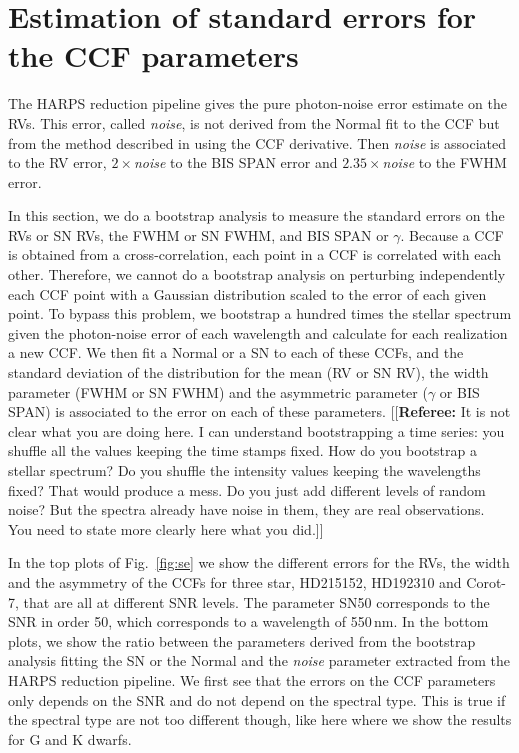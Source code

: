 \documentclass[11pt, oneside]{article}
\newcommand{\comment}[1]{{\color{red}[[\textbf{Referee: }#1]]}}
\begin{document}
\section{Estimation of standard errors for the CCF parameters} \label{sec:5}

The HARPS reduction pipeline gives the pure photon-noise error estimate on the RVs. This error, called \emph{noise}, is not derived from the Normal fit to the CCF but from the method described in \citet{Bouchy-2001b} using the CCF derivative. Then \emph{noise} is associated to the RV error, $2\times$\emph{noise} to the BIS SPAN error and $2.35\times$\emph{noise} to the FWHM error.

In this section, we do a bootstrap analysis to measure the standard errors on the RVs or SN RVs, the FWHM or SN FWHM, and BIS SPAN or $\gamma$. Because a CCF is obtained from a cross-correlation, each point in a CCF is correlated with each other. Therefore, we cannot do a bootstrap analysis on perturbing independently each CCF point with a Gaussian distribution scaled to the error of each given point. To bypass this problem, we bootstrap a hundred times the stellar spectrum given the photon-noise error of each wavelength and calculate for each realization a new CCF. We then fit a Normal or a SN to each of these CCFs, and the standard deviation of the distribution for the mean (RV or SN RV), the width parameter (FWHM or SN FWHM) and the asymmetric parameter ($\gamma$ or BIS SPAN) is associated to the error on each of these parameters.
\comment{It is not clear what you are doing here. I can understand bootstrapping a time series: you shuffle all the values keeping the time stamps fixed. How do you bootstrap a stellar spectrum? Do you shuffle the intensity values keeping the wavelengths fixed? That would produce a mess. Do you just add different levels of random noise? But the spectra already have noise in them, they are real observations. You need to state more clearly here what you did.}

In the top plots of Fig.~\ref{fig:se} we show the different errors for the RVs, the width and the asymmetry of the CCFs for three star, HD215152, HD192310 and Corot-7, that are all at different SNR levels. The parameter SN50 corresponds to the SNR in order 50, which corresponds to a wavelength of 550\,nm. In the bottom plots, we show the ratio between the parameters derived from the bootstrap analysis fitting the SN or the Normal and the \emph{noise} parameter extracted from the HARPS reduction pipeline. We first see that the errors on the CCF parameters only depends on the SNR and do not depend on the spectral type. This is true if the spectral type are not too different though, like here where we show the results for G and K dwarfs.
\end{document}
